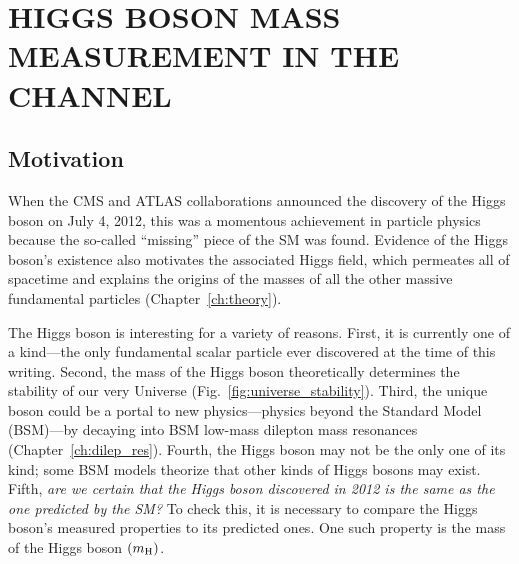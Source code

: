 \chapter{HIGGS BOSON MASS MEASUREMENT IN THE \texorpdfstring{\hzzfourl}{H to ZZ to 4l} CHANNEL}
\label{ch:higgs_mass}
\section{Motivation}
\label{sec:higgs_motivation}
When the CMS and ATLAS collaborations announced the discovery of the Higgs boson on July 4, 2012,
this was a momentous achievement in particle physics because the so-called ``missing'' piece of the SM was found.
Evidence of the Higgs boson's existence also motivates the associated Higgs field, which permeates all of spacetime and explains the origins of the masses of all the other massive fundamental particles (Chapter~\ref{ch:theory}).

The Higgs boson is interesting for a variety of reasons.
First, it is currently one of a kind---the only fundamental scalar particle ever discovered at the time of this writing.
Second, the mass of the Higgs boson theoretically determines the stability of our very Universe (Fig.~\ref{fig:universe_stability}).
Third, the unique boson could be a portal to new physics---\ie physics beyond the Standard Model (BSM)---\eg by decaying into BSM low-mass dilepton mass resonances (Chapter~\ref{ch:dilep_res}).
Fourth, the Higgs boson may not be the only one of its kind; some BSM models theorize that other kinds of Higgs bosons may exist.
Fifth, \emph{are we certain that the Higgs boson discovered in 2012 is the same as the one predicted by the SM?}
To check this, it is necessary to compare the Higgs boson's measured properties to its predicted ones.
One such property is the mass of the Higgs boson $\left( m_{\mathrm{H}} \right)$.

